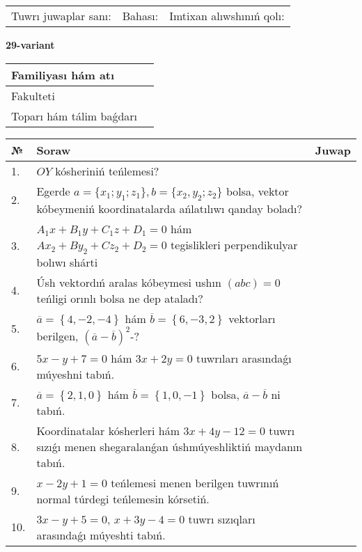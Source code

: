 \documentclass{article}
\begin{document}
\vspace{1cm}

\begin{tabular}{lll}
Tuwrı juwaplar sanı: \underline{\hspace{1.5cm}} & 
Bahası: \underline{\hspace{1.5cm}} & 
Imtixan alıwshınıń qolı: \underline{\hspace{2cm}} \\
\end{tabular}

\egroup

\newpage


\textbf{29-variant}\\

\bgroup
\def\arraystretch{1.6} %

\begin{tabular}{|m{5.7cm}|m{9.5cm}|}
\hline
Familiyası hám atı & \\
\hline
Fakulteti  & \\
\hline
Toparı hám tálim baǵdarı  & \\
\hline
\end{tabular}

\vspace{1cm}

\begin{tabular}{|m{0.7cm}|m{10cm}|m{4cm}|}
\hline
№ & Soraw & Juwap \\
\hline
1. & $OY$ kósheriniń teńlemesi? &  \\
\hline
2. & Egerde $a=\{ x_1; y_1; z_1\}, b=\{ x_2, y_2; z_2\}$ bolsa, vektor kóbeymeniń koordinatalarda ańlatılıwı qanday boladı? &  \\
\hline
3. & $A_1x+B_1y+C_1z+D_1=0$ hám $Ax_2+By_2+Cz_2+D_2=0$ tegislikleri perpendikulyar bolıwı shárti &  \\
\hline
4. & Úsh vektordıń aralas kóbeymesi ushın $(abc)=0$ teńligi orınlı bolsa ne dep ataladı? &  \\
\hline
5. & $\overline{a}=\left\{ 4,-2,-4 \right\}$ hám $\overline{b}=\left\{ 6,-3, 2 \right\}$ vektorları berilgen, $(\overline{a}-\overline{b}) ^{2}$-? &  \\
\hline
6. & $5x-y+7=0$ hám $3x+2y=0$ tuwrıları arasındaǵı múyeshni tabıń. &  \\
\hline
7. & $\overline{a}=\left\{ 2, 1, 0 \right\}$ hám $\overline{b}=\left\{ 1, 0,-1 \right\}$ bolsa, $\overline{a}-\overline{b}$ ni tabıń. &  \\
\hline
8. & Koordinatalar kósherleri hám $ 3x+4y-12=0 $ tuwrı sızıǵı menen shegaralanǵan úshmúyeshliktiń maydanın tabıń. &  \\
\hline
9. & $x-2y+1=0$ teńlemesi menen berilgen tuwrınıń normal túrdegi teńlemesin kórsetiń. &  \\
\hline
10. & $3x-y+5=0$, $x+3y-4=0$ tuwrı sızıqları arasındaǵı múyeshti tabıń. &  \\
\hline
\end{tabular}
\end{document}
